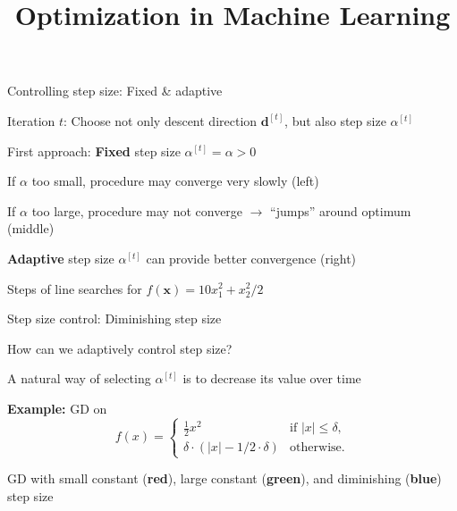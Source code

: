 \documentclass[11pt,compress,t,notes=noshow, xcolor=table]{beamer}
\title{Optimization in Machine Learning}
\begin{document}

\begin{framei}{Controlling step size: Fixed \& adaptive}
\item Iteration $t$: Choose not only descent direction $\mathbf{d}^{[t]}$, but also step size $\alpha^{[t]}$
\item First approach: \textbf{Fixed} step size $\alpha^{[t]} = \alpha > 0$
\begin{itemizeS}[footnotesize]
\item If $\alpha$ too small, procedure may converge very slowly (left)
\item If $\alpha$ too large, procedure may not converge $\rightarrow$ \enquote{jumps} around optimum (middle)
\end{itemizeS}
\item \textbf{Adaptive} step size $\alpha^{[t]}$ can provide better convergence (right)
\splitVThree
{}
{}{}
\begin{center}\begin{footnotesize}
Steps of line searches for $f(\bm{x}) = 10 x_1^2 + x_2^2/2$
\end{footnotesize}\end{center} 		
\end{framei}
	
\begin{framei}{Step size control: Diminishing step size}
\item How can we adaptively control step size?
\item A natural way of selecting $\alpha^{[t]}$ is to decrease its value over time
\item \textbf{Example:} GD on
$$f(x) = \begin{cases}
\frac{1}{2} x^2 & \text{if $|x| \le \delta$}, \\
\delta \cdot (|x|- 1 / 2 \cdot \delta) & \text{otherwise}.\end{cases}$$
\begin{center}\begin{footnotesize}
GD with small constant (\textbf{red}), large constant (\textbf{green}), and diminishing (\textbf{blue}) step size
\end{footnotesize}\end{center}
\end{framei}	
	
\end{document}
